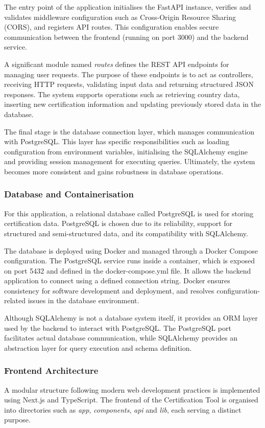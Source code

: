 The entry point of the application initialises the FastAPI instance, verifies and validates middleware configuration such as Cross-Origin Resource Sharing (CORS), and registers API routes. This configuration enables secure communication between the frontend (running on port 3000) and the backend service.

A significant module named \textit{routes} defines the REST API endpoints for managing user requests. The purpose of these endpoints is to act as controllers, receiving HTTP requests, validating input data and returning structured JSON responses. The system supports operations such as retrieving country data, inserting new certification information and updating previously stored data in the database.

The final stage is the database connection layer, which manages communication with PostgreSQL. This layer has specific responsibilities such as loading configuration from environment variables, initialising the SQLAlchemy engine and providing session management for executing queries. Ultimately, the system becomes more consistent and gains robustness in database operations.


\subsubsection{Database and Containerisation}
For this application, a relational database called PostgreSQL is used for storing certification data. PostgreSQL is chosen due to its reliability, support for structured and semi-structured data, and its compatibility with SQLAlchemy.

The database is deployed using Docker and managed through a Docker Compose configuration. The PostgreSQL service runs inside a container, which is exposed on port 5432 and defined in the docker-compose.yml file. It allows the backend application to connect using a defined connection string. Docker ensures consistency for software development and deployment, and resolves configuration-related issues in the database environment.

Although SQLAlchemy is not a database system itself, it provides an ORM layer used by the backend to interact with PostgreSQL. The PostgreSQL port facilitates actual database communication, while SQLAlchemy provides an abstraction layer for query execution and schema definition.

\subsubsection{Frontend Architecture}
A modular structure following modern web development practices is implemented using Next.js and TypeScript. The frontend of the Certification Tool is organised into directories such as \textit{app}, \textit{components}, \textit{api} and \textit{lib}, each serving a distinct purpose.

